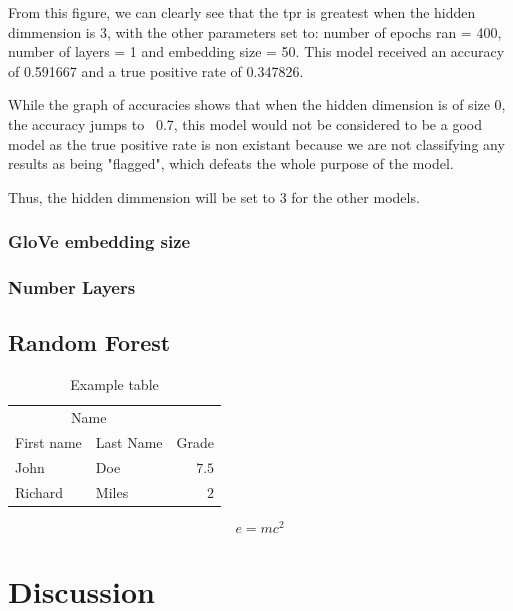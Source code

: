 \documentclass[twoside,twocolumn]{article}
\begin{document}
From this figure, we can clearly see that the tpr is greatest when the hidden dimmension is 3,
 with the other parameters set to: number of epochs ran = 400, number of layers = 1 and embedding 
 size = 50. This model received an accuracy of 0.591667 and a true positive rate of 0.347826.

While the graph of accuracies shows that when the hidden dimension is of size 0, the accuracy jumps
to ~0.7, this model would not be considered to be a good model as the true positive rate is non existant
because we are not classifying any results as being "flagged", which defeats the whole purpose of the model.

Thus, the hidden dimmension will be set to 3 for the other models.

\subsubsection{GloVe embedding size}

\subsubsection{Number Layers}

\subsection{Random Forest}

\begin{table}[h]
\caption{Example table}
\centering
\begin{tabular}{llr}
\toprule
\multicolumn{2}{c}{Name} \\
\cmidrule(r){1-2}
First name & Last Name & Grade \\
\midrule
John & Doe & $7.5$ \\
Richard & Miles & $2$ \\
\bottomrule
\end{tabular}
\end{table}

\blindtext %

\begin{equation}
\label{eq:emc}
e = mc^2
\end{equation}

\blindtext %


\section{Discussion}
\end{document}
